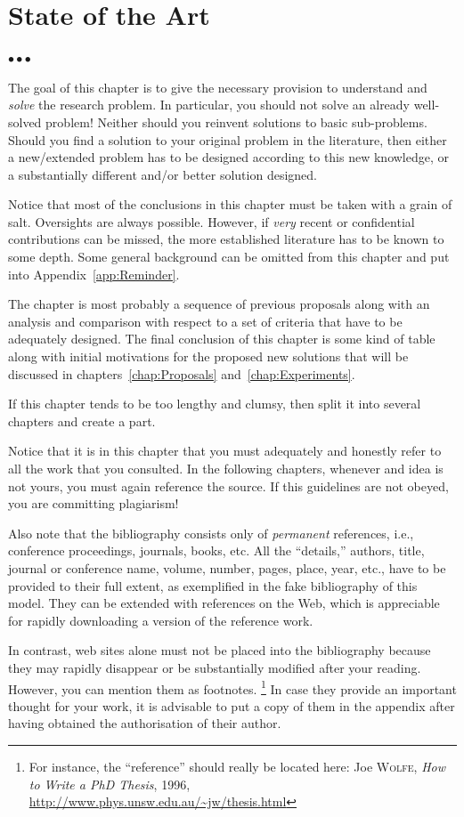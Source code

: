 \documentclass[11pt, english, screen, research-development]{report-rd-info}
\newenvironment{explanation}
{\color{blue}
 \begin{list}{}{\hspace{0.2\textwidth}\color{blue}}\item $\bullet\bullet\bullet$
}
{\end{list}}
\begin{document}
\chapter{State of the Art}
\label{chap:StateOfTheArt}

\begin{explanation}
   The goal of this chapter is to give the necessary provision to understand and \emph{solve} the research problem.
   In particular, you should not solve an already well-solved problem!  Neither should you reinvent solutions to basic sub-problems.
   Should you find a solution to your original problem in the literature, then either a new/extended problem has to be designed according to this new knowledge, or a substantially different and/or better solution designed.

   Notice that most of the conclusions in this chapter must be taken with a grain of salt.
   Oversights are always possible.
   However, if \emph{very} recent or confidential contributions can be missed, the more established literature has to be known to some depth.
   Some general background can be omitted from this chapter and put into Appendix~\ref{app:Reminder}.

   The chapter is most probably a sequence of previous proposals along with an analysis and comparison with respect to a set of criteria that have to be adequately designed.
   The final conclusion of this chapter is some kind of table along with initial motivations for the proposed new solutions that will be discussed in chapters~\ref{chap:Proposals} and~\ref{chap:Experiments}.

   If this chapter tends to be too lengthy and clumsy, then split it into several chapters and create a part.

   Notice that it is in this chapter that you must adequately and honestly refer to all the work that you consulted.
   In the following chapters, whenever and idea is not yours, you must again reference the source.
   If this guidelines are not obeyed, you are committing plagiarism!

   Also note that the bibliography consists only of \emph{permanent} references, i.e., conference proceedings, journals, books, etc.
   All the ``details,'' authors, title, journal or conference name, volume, number, pages, place, year, etc., have to be provided to their full extent, as exemplified in the fake bibliography of this model.
   They can be extended with references on the Web, which is appreciable for rapidly downloading a version of the reference work.

   In contrast, web sites alone must not be placed into the bibliography because they may rapidly disappear or be substantially modified after your reading.
   However, you can mention them as footnotes.%
   \footnote{For instance, the ``reference'' \cite{Wolfe} should really be located here: Joe  \textsc{Wolfe}, \emph{How to Write a PhD Thesis}, 1996, \url{http://www.phys.unsw.edu.au/~jw/thesis.html}}
   In case they provide an important thought for your work, it is advisable to put a copy of them in the appendix after having obtained the authorisation of their author.
\end{explanation}
\end{document}
